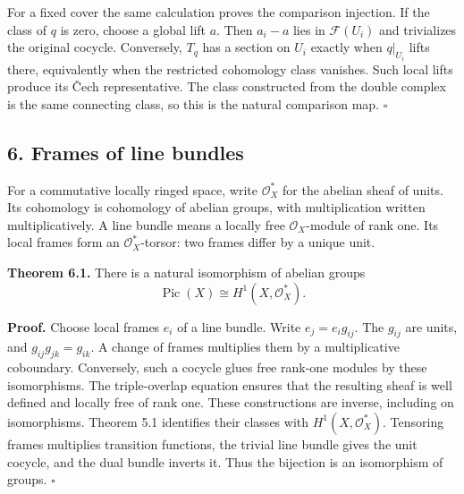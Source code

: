 \documentclass[11pt]{article}
\begin{document}
For a fixed cover the same calculation proves the comparison injection.
If the class of \(q\) is zero, choose a global lift \(a\). Then
\(a_i-a\) lies in \(\mathcal F(U_i)\) and trivializes the original
cocycle. Conversely, \(T_q\) has a section on \(U_i\) exactly when
\(q|_{U_i}\) lifts there, equivalently when the restricted cohomology
class vanishes. Such local lifts produce its Čech representative. The
class constructed from the double complex is the same connecting class,
so this is the natural comparison map. \(\square\)

\subsection{6. Frames of line bundles}\label{frames-of-line-bundles}

For a commutative locally ringed space, write \(\mathcal O_X^*\) for the
abelian sheaf of units. Its cohomology is cohomology of abelian groups,
with multiplication written multiplicatively. A line bundle means a
locally free \(\mathcal O_X\)-module of rank one. Its local frames form
an \(\mathcal O_X^*\)-torsor: two frames differ by a unique unit.

\textbf{Theorem 6.1.} There is a natural isomorphism of abelian groups
\[
\operatorname{Pic}(X)\cong H^1(X,\mathcal O_X^*).
\]

\textbf{Proof.} Choose local frames \(e_i\) of a line bundle. Write
\(e_j=e_i g_{ij}\). The \(g_{ij}\) are units, and
\(g_{ij}g_{jk}=g_{ik}\). A change of frames multiplies them by a
multiplicative coboundary. Conversely, such a cocycle glues free
rank-one modules by these isomorphisms. The triple-overlap equation
ensures that the resulting sheaf is well defined and locally free of
rank one. These constructions are inverse, including on isomorphisms.
Theorem 5.1 identifies their classes with \(H^1(X,\mathcal O_X^*)\).
Tensoring frames multiplies transition functions, the trivial line
bundle gives the unit cocycle, and the dual bundle inverts it. Thus the
bijection is an isomorphism of groups. \(\square\)
\end{document}
